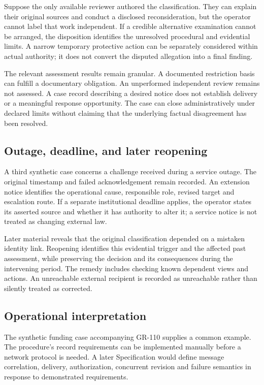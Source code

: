\documentclass[11pt,a4paper]{article}
\begin{document}
Suppose the only available reviewer authored the classification. They can explain their original sources and conduct a disclosed reconsideration, but the operator cannot label that work independent. If a credible alternative examination cannot be arranged, the disposition identifies the unresolved procedural and evidential limits. A narrow temporary protective action can be separately considered within actual authority; it does not convert the disputed allegation into a final finding.

The relevant assessment results remain granular. A documented restriction basis can fulfill a documentary obligation. An unperformed independent review remains not assessed. A case record describing a desired notice does not establish delivery or a meaningful response opportunity. The case can close administratively under declared limits without claiming that the underlying factual disagreement has been resolved.

\subsection{Outage, deadline, and later reopening}
A third synthetic case concerns a challenge received during a service outage. The original timestamp and failed acknowledgement remain recorded. An extension notice identifies the operational cause, responsible role, revised target and escalation route. If a separate institutional deadline applies, the operator states its asserted source and whether it has authority to alter it; a service notice is not treated as changing external law.

Later material reveals that the original classification depended on a mistaken identity link. Reopening identifies this evidential trigger and the affected past assessment, while preserving the decision and its consequences during the intervening period. The remedy includes checking known dependent views and actions. An unreachable external recipient is recorded as unreachable rather than silently treated as corrected.

\subsection{Operational interpretation}
The synthetic funding case accompanying GR-110 supplies a common example. The procedure's record requirements can be implemented manually before a network protocol is needed. A later Specification would define message correlation, delivery, authorization, concurrent revision and failure semantics in response to demonstrated requirements.
\end{document}
